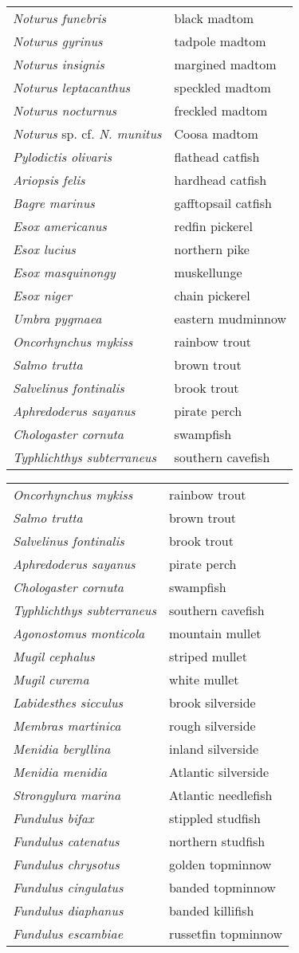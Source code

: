 \documentclass[11pt]{article}
\begin{document}
\vspace{\baselineskip}

%
\textbf{\Student}

\begin{tabular}{@{}L{3in}L{3in}@{}}
\textit{Noturus funebris} &   black madtom\tabularnewline
\textit{Noturus gyrinus} &   tadpole madtom\tabularnewline
\textit{Noturus insignis} &   margined madtom\tabularnewline
\textit{Noturus leptacanthus} &   speckled madtom\tabularnewline
\textit{Noturus nocturnus} &   freckled madtom\tabularnewline
\textit{Noturus} sp. cf. \textit{N. munitus} &   Coosa madtom\tabularnewline
\textit{Pylodictis olivaris} &   flathead catfish\tabularnewline
\textit{Ariopsis felis} &   hardhead catfish\tabularnewline
\textit{Bagre marinus} &   gafftopsail catfish\tabularnewline
\textit{Esox americanus} &   redfin pickerel\tabularnewline
\textit{Esox lucius} &   northern pike\tabularnewline
\textit{Esox masquinongy} &   muskellunge\tabularnewline
\textit{Esox niger} &   chain pickerel\tabularnewline
\textit{Umbra pygmaea} &   eastern mudminnow\tabularnewline
\textit{Oncorhynchus mykiss} &   rainbow trout\tabularnewline
\textit{Salmo trutta} &   brown trout\tabularnewline
\textit{Salvelinus fontinalis} &   brook trout\tabularnewline
\textit{Aphredoderus sayanus} &   pirate perch\tabularnewline
\textit{Chologaster cornuta} &   swampfish\tabularnewline
\textit{Typhlichthys subterraneus} &   southern cavefish\tabularnewline
\end{tabular}

\newpage

\vspace{\baselineskip}

%
\textbf{\Student}

\begin{tabular}{@{}L{3in}L{3in}@{}}
\textit{Oncorhynchus mykiss} &   rainbow trout\tabularnewline
\textit{Salmo trutta} &   brown trout\tabularnewline
\textit{Salvelinus fontinalis} &   brook trout\tabularnewline
\textit{Aphredoderus sayanus} &   pirate perch\tabularnewline
\textit{Chologaster cornuta} &   swampfish\tabularnewline
\textit{Typhlichthys subterraneus} &   southern cavefish\tabularnewline
\textit{Agonostomus monticola} &   mountain mullet\tabularnewline
\textit{Mugil cephalus} &   striped mullet\tabularnewline
\textit{Mugil curema} &   white mullet\tabularnewline
\textit{Labidesthes sicculus} &   brook silverside\tabularnewline
\textit{Membras martinica} &   rough silverside\tabularnewline
\textit{Menidia beryllina} &   inland silverside\tabularnewline
\textit{Menidia menidia} &   Atlantic silverside\tabularnewline
\textit{Strongylura marina} &   Atlantic needlefish\tabularnewline
\textit{Fundulus bifax} &   stippled studfish\tabularnewline
\textit{Fundulus catenatus} &   northern studfish\tabularnewline
\textit{Fundulus chrysotus} &   golden topminnow\tabularnewline
\textit{Fundulus cingulatus} &   banded topminnow\tabularnewline
\textit{Fundulus diaphanus} &   banded killifish\tabularnewline
\textit{Fundulus escambiae} &   russetfin topminnow\tabularnewline
\end{tabular}
\end{document}
